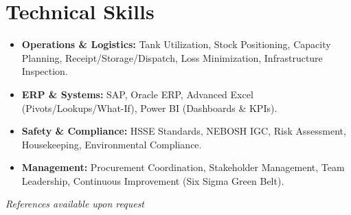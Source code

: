\documentclass[11pt,a4paper]{article}
\begin{document}
\section{Technical Skills}
\begin{itemize}[label={\color{awesome-blue}\small\textbullet}, leftmargin=*, itemsep=0pt, parsep=0pt]
    \raggedright
    \item \textbf{Operations \& Logistics:} Tank Utilization, Stock Positioning, Capacity Planning, Receipt/Storage/Dispatch, Loss Minimization, Infrastructure Inspection.
    \item \textbf{ERP \& Systems:} SAP, Oracle ERP, Advanced Excel (Pivots/Lookups/What-If), Power BI (Dashboards \& KPIs).
    \item \textbf{Safety \& Compliance:} HSSE Standards, NEBOSH IGC, Risk Assessment, Housekeeping, Environmental Compliance.
    \item \textbf{Management:} Procurement Coordination, Stakeholder Management, Team Leadership, Continuous Improvement (Six Sigma Green Belt).
\end{itemize}

\vfill
\begin{center}
    \textit{References available upon request}
\end{center}
\end{document}
